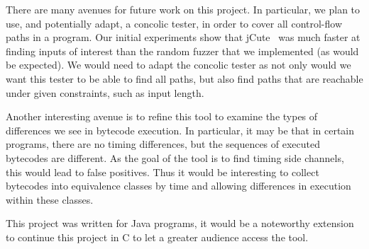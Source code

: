 
There are many avenues for future work on this project. In particular, 
we plan to use, and potentially adapt, a concolic tester, in order to
cover all control-flow paths in a program. Our initial experiments
show that jCute~\cite{Sen2006} was much faster
at finding inputs of interest than the random fuzzer that we
implemented (as would be expected). We would need to adapt the
concolic tester as not only would we want this tester to
be able to find all paths, but also find paths that are reachable under
given constraints, such as input length. 

Another interesting avenue is to refine this tool to examine the types
of differences we see in bytecode execution. In particular, it may be
that in certain programs, there are no timing
differences, but the sequences of executed bytecodes are different. As
the goal of the tool is to find timing side channels, this would lead to
false positives. Thus it would be interesting to 
collect bytecodes into equivalence classes by time and allowing
differences in execution within these classes. 

This project was written for Java programs, it would be a noteworthy
extension to continue this project in C to let a greater audience
access the tool. 
